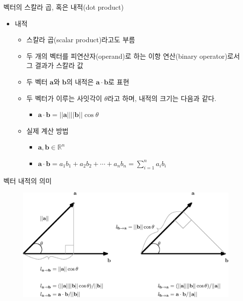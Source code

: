 \documentclass{beamer}
\begin{document}
\begin{frame}{벡터의 스칼라 곱, 혹은 내적(dot product)}
\begin{itemize}
\item 내적
	\begin{itemize}
	\item 스칼라 곱(scalar product)라고도 부름 
	\item 두 개의 벡터를 피연산자(operand)로 하는 이항 연산(binary operator)로서 그 결과가 스칼라 값
	\item 두 벡터 $\mathbf a$와 $\mathbf b$의 내적은 $\mathbf a \cdot \mathbf b$로 표현
	\item 두 벡터가 이루는 사잇각이 $\theta$라고 하며, 내적의 크기는 다음과 같다.
		\begin{itemize}
		\item $\mathbf a \cdot \mathbf b = || \mathbf a || ||\mathbf b || \cos \theta$
		\end{itemize}
	\item 실제 계산 방법
		\begin{itemize}
		\item $\mathbf a , \mathbf b \in \mathbb R^n $
		\item $\mathbf a \cdot \mathbf b = a_1 b_1 + a_2 b_2 + \cdots + a_n b_n = \sum_{i=1}^n a_i b_i $
		\end{itemize}
	\end{itemize}
\end{itemize}

\end{frame}

\begin{frame}{벡터 내적의 의미}
\begin{figure}
\includegraphics[width=12cm]{Math_vector/innerProduct.eps}
\end{figure}

\end{frame}
\end{document}
